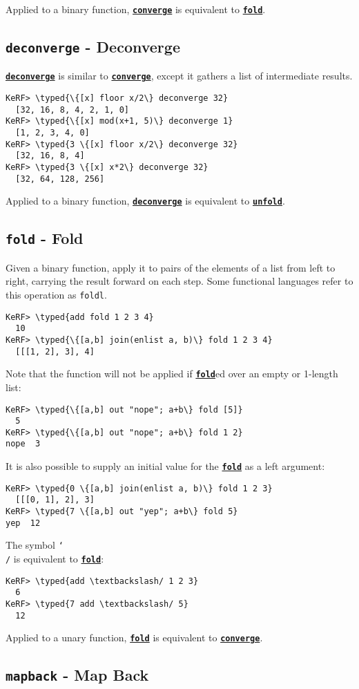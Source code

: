 \documentclass{article}
\newcommand{\typed}[1]{\textcolor{TealBlue}{#1}}
\newcommand{\primdefu}[3]{\subsection{\texttt{#1} - #2}\label{prim:#3}}
\newcommand{\primu}[2]{\hyperref[prim:#2]{\textbf{\texttt{#1}}}}
\newcommand{\combdef}[2]{\primdefu{#1}{#2}{#1}}
\newcommand{\comb}[1]{\primu{#1}{#1}}
\begin{document}
Applied to a binary function, \comb{converge} is equivalent to \comb{fold}.

\combdef{deconverge}{Deconverge}

\comb{deconverge} is similar to \comb{converge}, except it gathers a list of intermediate results.
\begin{Verbatim}
KeRF> \typed{\{[x] floor x/2\} deconverge 32}
  [32, 16, 8, 4, 2, 1, 0]
KeRF> \typed{\{[x] mod(x+1, 5)\} deconverge 1}
  [1, 2, 3, 4, 0]
KeRF> \typed{3 \{[x] floor x/2\} deconverge 32}
  [32, 16, 8, 4]
KeRF> \typed{3 \{[x] x*2\} deconverge 32}
  [32, 64, 128, 256]
\end{Verbatim}

Applied to a binary function, \comb{deconverge} is equivalent to \comb{unfold}.

\pagebreak
\combdef{fold}{Fold}

Given a binary function, apply it to pairs of the elements of a list from left to right, carrying the result forward on each step. Some functional languages refer to this operation as \texttt{foldl}.
\begin{Verbatim}
KeRF> \typed{add fold 1 2 3 4}
  10
KeRF> \typed{\{[a,b] join(enlist a, b)\} fold 1 2 3 4}
  [[[1, 2], 3], 4]
\end{Verbatim}

Note that the function will not be applied if \comb{fold}ed over an empty or 1-length list:
\begin{Verbatim}
KeRF> \typed{\{[a,b] out "nope"; a+b\} fold [5]}
  5
KeRF> \typed{\{[a,b] out "nope"; a+b\} fold 1 2}
nope  3
\end{Verbatim}

It is also possible to supply an initial value for the \comb{fold} as a left argument:
\begin{Verbatim}
KeRF> \typed{0 \{[a,b] join(enlist a, b)\} fold 1 2 3}
  [[[0, 1], 2], 3]
KeRF> \typed{7 \{[a,b] out "yep"; a+b\} fold 5}
yep  12
\end{Verbatim}

The symbol \texttt{\char`\\/} is equivalent to \comb{fold}:
\begin{Verbatim}
KeRF> \typed{add \textbackslash/ 1 2 3}
  6
KeRF> \typed{7 add \textbackslash/ 5}
  12
\end{Verbatim}

Applied to a unary function, \comb{fold} is equivalent to \comb{converge}.

\combdef{mapback}{Map Back}
\end{document}
